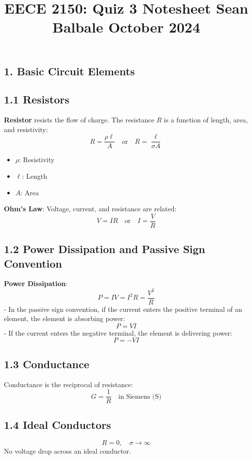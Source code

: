 \documentclass[10pt]{article}
\title{
    \raggedright
    \large EECE 2150: Quiz 3 Notesheet \hfill Sean Balbale \hfill October 2024
    \vspace{-4em}
}
\date{}
\begin{document}
\maketitle

\begin{multicols}{2}

\section*{1. Basic Circuit Elements}

\subsection*{1.1 Resistors}
\textbf{Resistor} resists the flow of charge. The resistance \(R\) is a function of length, area, and resistivity:
\[
R = \frac{\rho \ell}{A} \quad \text{or} \quad R = \frac{\ell}{\sigma A}
\]
\begin{itemize}\itemsep0pt
    \item \( \rho \): Resistivity
    \item \( \ell \): Length
    \item \( A \): Area
\end{itemize}

\textbf{Ohm's Law}: Voltage, current, and resistance are related:
\[
V = IR \quad \text{or} \quad I = \frac{V}{R}
\]

\subsection*{1.2 Power Dissipation and Passive Sign Convention}
\textbf{Power Dissipation}:
\[
P = IV = I^2 R = \frac{V^2}{R}
\]
- In the passive sign convention, if the current enters the positive terminal of an element, the element is absorbing power:
\[
P = VI
\]
- If the current enters the negative terminal, the element is delivering power:
\[
P = -VI
\]

\subsection*{1.3 Conductance}
Conductance is the reciprocal of resistance:
\[
G = \frac{1}{R} \quad \text{in Siemens (S)}
\]

\subsection*{1.4 Ideal Conductors}
\[ R = 0, \quad \sigma \to \infty \]
No voltage drop across an ideal conductor.


\end{multicols}
\end{document}
